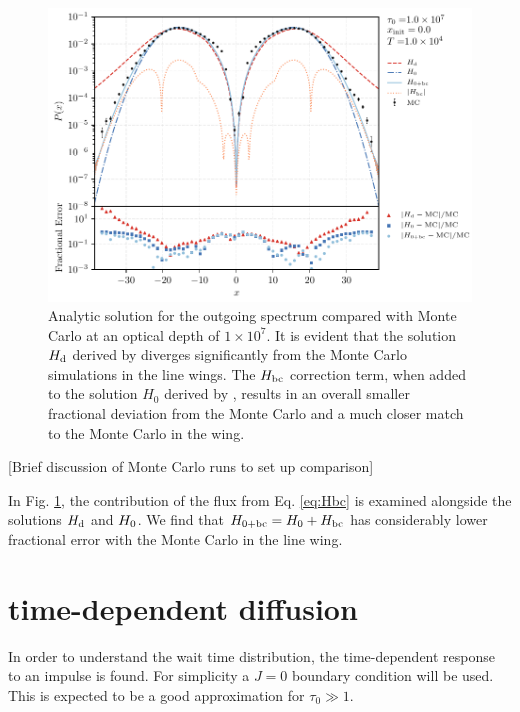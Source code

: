 \documentclass{aastex63}
\begin{document}
\begin{figure}
    \centering
    \includegraphics{1m_x_pdf_residualv2_log.pdf}
    \caption{Analytic solution for the outgoing spectrum compared with Monte Carlo at an optical depth of $1 \times 10^7$. It is evident that the solution $H_{\rm d}$ derived by \citet{1973MNRAS.162...43H} diverges significantly from the Monte Carlo simulations in the line wings. The $H_{\rm bc}$ correction term, when added to the solution $H_0$ derived by \citet{2006ApJ...649...14D}, results in an overall smaller fractional deviation from the Monte Carlo and a much closer match to the Monte Carlo in the wing.}
    \label{fig:sol_mc_residual}
\end{figure}

[Brief discussion of Monte Carlo runs to set up comparison]

In Fig. \ref{fig:sol_mc_residual}, the contribution of the flux from Eq. \ref{eq:Hbc} is examined alongside the solutions $H_{\rm d}$ and $H_{\rm 0}$. We find that $H_{\rm 0 + bc} = H_{\rm 0} + H_{\rm bc}$ has considerably lower fractional error with the Monte Carlo in the line wing.

\section{ time-dependent diffusion }

In order to understand the wait time distribution, the time-dependent response to an impulse is found. For simplicity a $J=0$ boundary condition will be used. This is expected to be a good approximation for $\tau_0 \gg 1$. 
\end{document}
